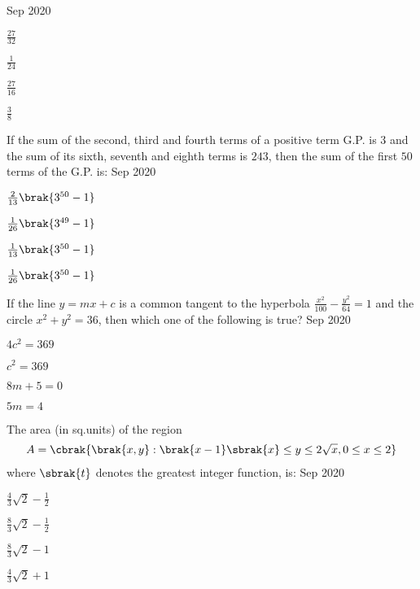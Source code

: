 	      \hfill{Sep 2020}
      \begin{enumerate}
      \begin{multicols}{4}
      \item $\frac{27}{32}$
      \item $\frac{1}{24}$
      \item $\frac{27}{16}$
      \item $\frac{3}{8}$
      \end{multicols}
      \end{enumerate}
      \item If the sum of the second, third and fourth terms of a positive term G.P. is $3$ and the sum of its sixth, seventh and eighth terms is $243$, then the sum of the first $50$ terms of the G.P. is:
	      \hfill{Sep 2020}
       \begin{enumerate}
      \begin{multicols}{4}
      \item $\frac{2}{13}\brak{3^{50}-1}$
      \item $\frac{1}{26}\brak{3^{49}-1}$
      \item $\frac{1}{13}\brak{3^{50}-1}$\item $\frac{1}{26}\brak{3^{50}-1}$
      \end{multicols}
      \end{enumerate}
     \item If the line $y=mx+c$ is a common tangent to the hyperbola $\frac{x^{2}}{100} - \frac{y^{2}}{64}=1$ and the circle $x^{2}+y^{2}=36$, then which one of the following is true?
	     \hfill{Sep 2020}
      \begin{enumerate}
      \begin{multicols}{4}
      \item $4c^{2}=369$
      \item $c^{2}=369$
      \item $8m+5=0$
      \item $5m=4$
      \end{multicols}
      \end{enumerate}
      \item The area (in sq.units) of the region 
	      \begin{align}
		      A = \cbrak{\brak{x,y}:\brak{x-1} \sbrak{x} \leq y \leq 2\sqrt{x}, 0\leq x\leq 2}
	      \end{align}
	      where $\sbrak{t}$ denotes the greatest integer function, is:
	      \hfill{Sep 2020}
      \begin{enumerate}
      \begin{multicols}{4}
      \item $\frac{4}{3}\sqrt{2}-\frac{1}{2}$
      \item $\frac{8}{3}\sqrt{2}-\frac{1}{2}$
      \item $\frac{8}{3}\sqrt{2}-1$
      \item $\frac{4}{3}\sqrt{2}+1$
      \end{multicols}
      \end{enumerate}
